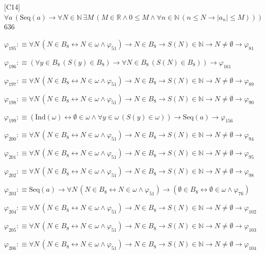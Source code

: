 \begin{fullproof}{[C14]}{$\forall a\,(\mathrm{Seq}(a) \to \forall N \in \mathbb{N}\,\exists M\,(M \in \mathbb{R} \land 0 \leq M \land \forall n \in \mathbb{N}\,(n \leq N \to \lvert a_{n} \rvert \leq M)))$}{636}
\begin{abbrevlist}
\item $\varphi_{195} :\equiv \forall N\,(N \in B_{8} \leftrightarrow N \in \omega \land \varphi_{51}) \to N \in B_{8} \to S(N) \in \mathbb{N} \to N \neq \emptyset \to \varphi_{81}$
\item $\varphi_{196} :\equiv (\forall y \in B_{8}\,(S(y) \in B_{8}) \to \forall N \in B_{8}\,(S(N) \in B_{8})) \to \varphi_{161}$
\item $\varphi_{197} :\equiv \forall N\,(N \in B_{8} \leftrightarrow N \in \omega \land \varphi_{51}) \to N \in B_{8} \to S(N) \in \mathbb{N} \to N \neq \emptyset \to \varphi_{89}$
\item $\varphi_{198} :\equiv \forall N\,(N \in B_{8} \leftrightarrow N \in \omega \land \varphi_{51}) \to N \in B_{8} \to S(N) \in \mathbb{N} \to N \neq \emptyset \to \varphi_{90}$
\item $\varphi_{199} :\equiv (\mathrm{Ind}(\omega) \leftrightarrow \emptyset \in \omega \land \forall y \in \omega\,(S(y) \in \omega)) \to \mathrm{Seq}(a) \to \varphi_{156}$
\item $\varphi_{200} :\equiv \forall N\,(N \in B_{8} \leftrightarrow N \in \omega \land \varphi_{51}) \to N \in B_{8} \to S(N) \in \mathbb{N} \to N \neq \emptyset \to \varphi_{94}$
\item $\varphi_{201} :\equiv \forall N\,(N \in B_{8} \leftrightarrow N \in \omega \land \varphi_{51}) \to N \in B_{8} \to S(N) \in \mathbb{N} \to N \neq \emptyset \to \varphi_{95}$
\item $\varphi_{202} :\equiv \forall N\,(N \in B_{8} \leftrightarrow N \in \omega \land \varphi_{51}) \to N \in B_{8} \to S(N) \in \mathbb{N} \to N \neq \emptyset \to \varphi_{98}$
\item $\varphi_{203} :\equiv \mathrm{Seq}(a) \to \forall N\,(N \in B_{8} \leftrightarrow N \in \omega \land \varphi_{51}) \to (\emptyset \in B_{8} \leftrightarrow \emptyset \in \omega \land \varphi_{76})$
\item $\varphi_{204} :\equiv \forall N\,(N \in B_{8} \leftrightarrow N \in \omega \land \varphi_{51}) \to N \in B_{8} \to S(N) \in \mathbb{N} \to N \neq \emptyset \to \varphi_{102}$
\item $\varphi_{205} :\equiv \forall N\,(N \in B_{8} \leftrightarrow N \in \omega \land \varphi_{51}) \to N \in B_{8} \to S(N) \in \mathbb{N} \to N \neq \emptyset \to \varphi_{103}$
\item $\varphi_{206} :\equiv \forall N\,(N \in B_{8} \leftrightarrow N \in \omega \land \varphi_{51}) \to N \in B_{8} \to S(N) \in \mathbb{N} \to N \neq \emptyset \to \varphi_{104}$

\end{abbrevlist}
\end{fullproof}
